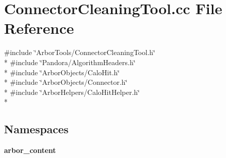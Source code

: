 \section{Connector\+Cleaning\+Tool.\+cc File Reference}
\label{ConnectorCleaningTool_8cc}
{\ttfamily \#include \char`\"{}Arbor\+Tools/\+Connector\+Cleaning\+Tool.\+h\char`\"{}}\\*
{\ttfamily \#include \char`\"{}Pandora/\+Algorithm\+Headers.\+h\char`\"{}}\\*
{\ttfamily \#include \char`\"{}Arbor\+Objects/\+Calo\+Hit.\+h\char`\"{}}\\*
{\ttfamily \#include \char`\"{}Arbor\+Objects/\+Connector.\+h\char`\"{}}\\*
{\ttfamily \#include \char`\"{}Arbor\+Helpers/\+Calo\+Hit\+Helper.\+h\char`\"{}}\\*
\subsection*{Namespaces}
\begin{DoxyCompactItemize}
\item 
 {\bf arbor\+\_\+content}
\end{DoxyCompactItemize}
